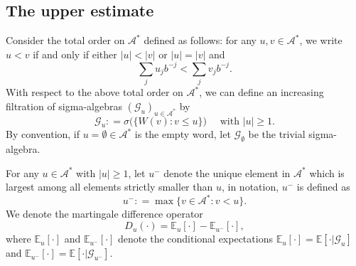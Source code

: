 \documentclass[12pt]{amsart}
\theoremstyle{definition}
\theoremstyle{remark}
\newcommand{\E}{\mathbb{E}}
\newcommand{\Ab}{\mathcal{A}}
\numberwithin{equation}{section}
\begin{document}
\subsection{The upper estimate}

Consider the total order on $\Ab^*$ defined as follows: for any $u, v\in \Ab^*$, we write  $u<v$ if and only if  either $|u|<|v|$ or $|u| = |v|$ and 
\[
\sum_{j} u_jb^{-j} < \sum_{j} v_j b^{-j}. 
\] 
With respect to the above total order on $\Ab^*$, we  can define an increasing filtration of sigma-algebras $(\mathscr{G}_u)_{u\in \Ab^*}$ by 
\[
\mathscr{G}_u: = \sigma\Big(\Big\{W(v): v\le u\Big\}\Big) \quad  \text{ with $|u|\ge 1$}.
\]
By convention,  if $u = \emptyset\in \Ab^*$ is the empty word,  let $\mathscr{G}_\emptyset$ be the trivial sigma-algebra.

For any $u\in \Ab^*$ with $|u|\ge 1$,  let  $u^{-}$ denote  the unique element in $\Ab^*$ which is largest among all elements strictly smaller than $u$, in notation,  $u^{-}$ is defined as 
\[
u^{-}: = \max\{v\in \Ab^*: v<u \}.
\]
 We denote the martingale difference operator 
\[
D_u(\cdot)= \E_u[\cdot] - \E_{u^{-}} [\cdot],
\]
where $\E_u[\cdot]$ and $\E_{u^{-}} [\cdot]$ denote the conditional expectations $\E_u[\cdot] =\E[\cdot|\mathscr{G}_u]$ and $\E_{u^{-}}[\cdot] =\E[\cdot|\mathscr{G}_{u^{-}}]$. 
\end{document}
